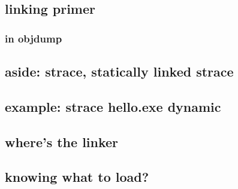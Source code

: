 \subsection{linking primer}


\subsubsection{in objdump}


\subsection{aside: strace, statically linked strace}



\subsection{example: strace hello.exe dynamic}



\subsection{where's the linker}



\subsection{knowing what to load?}



